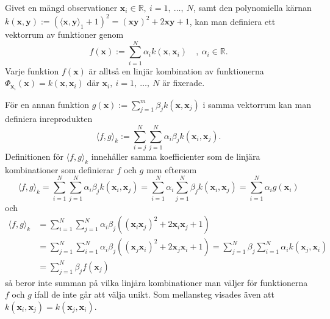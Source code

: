 \documentclass[a4paper, 12pt]{report}
\theoremstyle{definition}
\theoremstyle{remark}
\newcommand{\bfx}{\mathbf{x}}
\newcommand{\bfy}{\mathbf{y}}
\begin{document}
Givet en mängd observationer $\bfx_i\in\mathbb{R},~i=1,~\dots,~N$, samt den polynomiella kärnan $k\left(\bfx, \bfy\right):=\left(\langle \bfx, \bfy \rangle_1 + 1\right)^2 = \left(\bfx\bfy\right)^{2} + 2\bfx\bfy + 1$, kan man definiera ett vektorrum av funktioner genom
\begin{equation*}
	f\left(\bfx\right):=\sum_{i=1}^{N}\alpha_ik\left(\bfx, \bfx_i\right)\quad ,~\alpha_i\in\mathbb{R}.
\end{equation*}
Varje funktion $f\left(\bfx\right)$ är alltså en linjär kombination av funktionerna $\Phi_{\bfx_i}\left(\bfx\right)=k\left(\bfx,\bfx_i\right)$ där $\bfx_i,~i=1,~\dots,~N$ är fixerade. %

För en annan funktion $g\left(\bfx\right):=\sum_{j=1}^{m}\beta_jk\left(\bfx, \bfx_j\right)$ i samma vektorrum kan man definiera inreprodukten
\begin{equation}\label{eq:polykärnaprodukt}
	\langle f , g\rangle_k := \sum_{i=j}^{N}\sum_{j=1}^{N} \alpha_i \beta_j k\left(\bfx_i, \bfx_j\right).
\end{equation}
Definitionen för $\langle f, g \rangle_k$ innehåller samma koefficienter som de linjära kombinationer som definierar $f$ och $g$ men eftersom
\begin{equation}\label{eq:expansion1}
	\langle f, g \rangle_k = \sum_{i=1}^{N} \sum_{j=1}^{N} \alpha_i \beta_j k\left(\bfx_i, \bfx_j\right) = \sum_{i=1}^{N} \alpha_i \sum_{j=1}^{N}\beta_j k\left(\bfx_i, \bfx_j\right)=\sum_{i=1}^{N} \alpha_i g\left(\bfx_i\right)
\end{equation}
och
\begin{equation}\label{eq:expansion2}
\begin{aligned}
	\langle f, g \rangle_k &= \sum_{i=1}^{N} \sum_{j=1}^{N} \alpha_i \beta_j \left(\left(\bfx_i\bfx_j\right)^2 + 2\bfx_i\bfx_j+1\right)\\
	&= \sum_{j=1}^{N} \sum_{i=1}^{N} \alpha_i \beta_j \left(\left(\bfx_j\bfx_i\right)^2 + 2\bfx_j\bfx_i+1\right) = \sum_{j=1}^{N} \beta_j \sum_{i=1}^{N}\alpha_i k\left(\bfx_j, \bfx_i\right) \\
	&= \sum_{j=1}^{N} \beta_j f\left(\bfx_j\right)
\end{aligned}
\end{equation}
så beror inte summan på vilka linjära kombinationer man väljer för funktionerna $f$ och $g$ ifall de inte går att välja unikt. Som mellansteg visades även att $k\left(\bfx_i, \bfx_j\right)=k\left(\bfx_j, \bfx_i\right)$.
\end{document}
